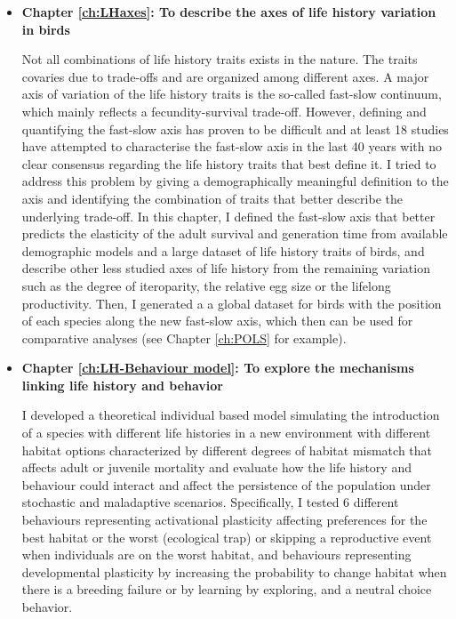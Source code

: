 \begin{itemize}
\item \textbf{Chapter \ref{ch:LHaxes}: To describe the axes of life history 
variation in birds}

Not all combinations of life history traits exists in the nature. The traits
covaries due to trade-offs and are organized among different axes. A major axis
of variation of the life history traits is the so-called fast-slow continuum,
which mainly reflects a fecundity-survival trade-off. However, defining and
quantifying the fast-slow axis has proven to be difficult and at least 18
studies have attempted to characterise the fast-slow axis in the last 40 years
with no clear consensus regarding the life history traits that best define it.
I tried to address this problem by giving a demographically meaningful
definition to the axis and identifying the combination of traits that better
describe the underlying trade-off.
In this chapter, I defined the fast-slow axis that better predicts the 
elasticity of the adult survival and generation time from available demographic 
models and a large dataset of life history traits of birds, and describe other
less studied axes of life history from the remaining variation such as the
degree of iteroparity, the relative egg size or the lifelong productivity. Then,
I generated a a global dataset for birds with the position of each species along
the new fast-slow axis, which then can be used for comparative analyses (see
Chapter \ref{ch:POLS} for example).
\bigskip


\item \textbf{Chapter \ref{ch:LH-Behaviour model}: To explore the mechanisms 
linking life history and behavior}

I developed a theoretical individual based model simulating the introduction of
a species with different life histories in a new environment with different
habitat options characterized by different degrees of habitat mismatch that
affects adult or juvenile mortality and evaluate how the life history and
behaviour could interact and affect the persistence of the population under
stochastic and maladaptive scenarios. Specifically, I tested 6 different
behaviours representing activational plasticity affecting preferences for the
best habitat or the worst (ecological trap) or skipping a reproductive event
when individuals are on the worst habitat, and behaviours representing
developmental plasticity by increasing the probability to change habitat
when there is a breeding failure or by learning by exploring, and a neutral
choice behavior.
\bigskip



\end{itemize}
